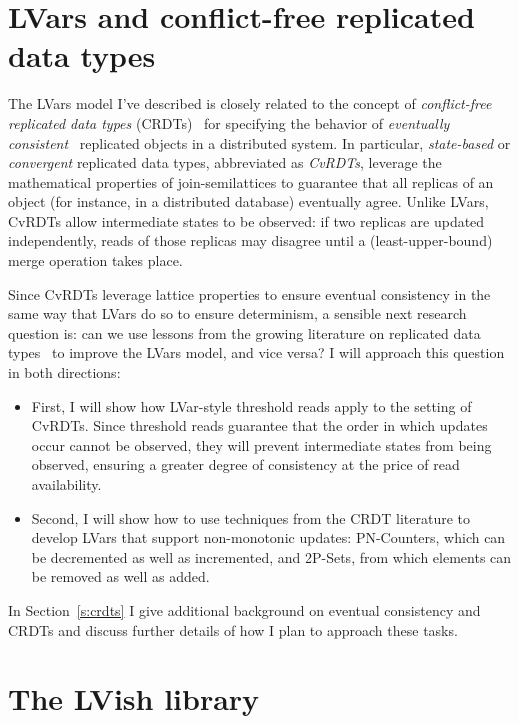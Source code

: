 \section{LVars and conflict-free replicated data types}

The LVars model I've described is closely related to the concept of
\emph{conflict-free replicated data types} (CRDTs)~\cite{crdts} for
specifying the behavior of \emph{eventually
  consistent}~\cite{vogels-ec} replicated objects in a distributed
system.  In particular, \emph{state-based} or \emph{convergent}
replicated data types, abbreviated as \emph{CvRDTs}, leverage the
mathematical properties of join-semilattices to guarantee that all
replicas of an object (for instance, in a distributed database)
eventually agree.  Unlike LVars, CvRDTs allow intermediate states to
be observed: if two replicas are updated independently, reads of those
replicas may disagree until a (least-upper-bound) merge operation
takes place.

Since CvRDTs leverage lattice properties to ensure eventual
consistency in the same way that LVars do so to ensure determinism, a
sensible next research question is: can we use lessons from the
growing literature on replicated data types~\cite{crdts, crdts-tr,
  rdts-popl14} to improve the LVars model, and vice versa?  I will
approach this question in both directions:
\begin{itemize}
\item First, I will show how LVar-style threshold reads apply to the
  setting of CvRDTs.  Since threshold reads guarantee that the order
  in which updates occur cannot be observed, they will prevent
  intermediate states from being observed, ensuring a greater degree
  of consistency at the price of read availability.
\item Second, I will show how to use techniques from the CRDT
  literature to develop LVars that support non-monotonic updates:
  PN-Counters, which can be decremented as well as incremented, and
  2P-Sets, from which elements can be removed as well as added.
\end{itemize}
In Section~\ref{s:crdts} I give additional background on eventual
consistency and CRDTs and discuss further details of how I plan to
approach these tasks.

\section{The LVish library}\label{ss:lvish}

